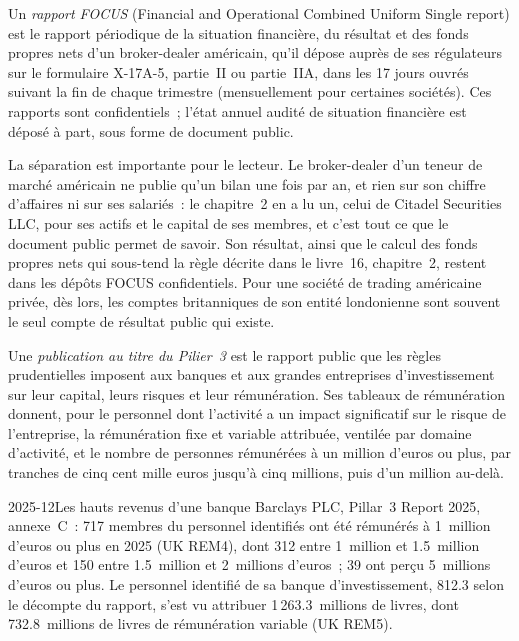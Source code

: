 \begin{definition}\label{def:in:reading-a-trading-firms-accounts:focus}
Un \emph{rapport FOCUS} (Financial and Operational Combined Uniform Single report) est le rapport périodique
de la situation financière, du résultat et des fonds propres nets d'un broker-dealer américain, qu'il dépose auprès de ses régulateurs sur le formulaire
X-17A-5, partie~II ou partie~IIA, dans les 17 jours ouvrés suivant la fin de chaque trimestre (mensuellement pour certaines sociétés). Ces rapports
sont confidentiels~; l'état annuel audité de situation financière est déposé à part, sous forme de document public.
\end{definition}

La séparation est importante pour le lecteur. Le broker-dealer d'un teneur de marché américain ne publie qu'un bilan une fois par an, et rien
sur son chiffre d'affaires ni sur ses salariés~: le chapitre~2 en a lu un, celui de Citadel Securities LLC, pour ses actifs et le capital de ses membres, et
c'est tout ce que le document public permet de savoir. Son résultat, ainsi que le calcul des fonds propres nets qui sous-tend la règle décrite dans le livre~16,
chapitre~2, restent dans les dépôts FOCUS confidentiels. Pour une société de trading américaine privée, dès lors, les comptes britanniques de
son entité londonienne sont souvent le seul compte de résultat public qui existe.

\begin{definition}\label{def:in:reading-a-trading-firms-accounts:pillar3}
Une \emph{publication au titre du Pilier~3} est le rapport public que les règles prudentielles imposent aux banques et
aux grandes entreprises d'investissement sur leur capital, leurs risques et leur rémunération. Ses tableaux de rémunération donnent, pour le personnel dont
l'activité a un impact significatif sur le risque de l'entreprise, la rémunération fixe et variable attribuée, ventilée par domaine d'activité, et le nombre de
personnes rémunérées à un million d'euros ou plus, par tranches de cinq cent mille euros jusqu'à cinq millions, puis d'un million
au-delà.
\end{definition}

\begin{dated}{2025-12}{Les hauts revenus d'une banque}\label{dat:in:reading-a-trading-firms-accounts:pillar3}
Barclays PLC, Pillar~3 Report 2025, annexe~C~: 717 membres du personnel identifiés ont été rémunérés à 1~million d'euros ou plus en 2025 (UK REM4),
dont 312 entre 1~million et 1.5~million d'euros et 150 entre 1.5~million et 2~millions d'euros~; 39 ont perçu
5~millions d'euros ou plus. Le personnel identifié de sa banque d'investissement, 812.3 selon le décompte du rapport, s'est vu attribuer
1\,263.3~millions de livres, dont 732.8~millions de livres de rémunération variable (UK REM5).
\end{dated}


